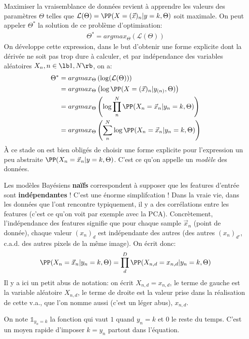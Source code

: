 \documentclass[french,twoside]{article}
\begin{document}
Maximiser la vraisemblance de données revient à apprendre les valeurs des paramètres $\Theta$ telles que $\mathcal{L}(\Theta) = \PP(X=(\vec{x})_n | y=k, \Theta)$ soit maximale. On peut appeler $\Theta^*$ la solution de ce problème d'optimisation:
\begin{align}
\Theta^* = argmax_\Theta (\mathcal{L}(\Theta) )
\end{align}
On développe cette expression, dans le but d'obtenir une forme explicite dont la dérivée ne soit pas trop dure à calculer, et par indépendance des variables aléatoires $X_n, n \in \lb 1, N \rb$, on a:
\begin{align}
\Theta^*
&= argmax_\Theta \left(\log(\mathcal{L}(\Theta) )   \right)
\\
&= argmax_\Theta \left( \log \PP(X=(\vec{x})_n | y_{(n)}, \Theta)        \right) \\
&= argmax_\Theta \left( \log \prod_n^N \PP(X_n=\vec{x}_n | y_n=k, \Theta)        \right) \\
&= argmax_\Theta \left(\sum_n^N \log \PP(X_n=\vec{x}_n | y_n=k, \Theta)        \right)
\end{align}
À ce stade on est bien obligés de choisir une forme explicite pour l'expression un peu abstraite $\PP(X_n=\vec{x}_n | y=k, \Theta)  $. C'est ce qu'on appelle un \textit{modèle} des données.

Les modèles Bayésiens \textbf{naïfs} correspondent à supposer que les features d'entrée sont \textbf{indépendantes} !
C'est une énorme simplifcation ! Dans la vraie vie, dans les données que l'ont rencontre typiquement, il y a des corrélations entre les features (c'est ce qu'on voit par exemple avec la PCA). Concrètement, l'indépendance des features signifie que pour chaque sample $\vec{x}_n$ (point de donnée), chaque valeur $(x_n)_d$ est indépendante des autres (des autres $(x_n)_{d'}$, c.a.d. des autres pixels de la même image). On écrit donc:
\begin{align}
\PP(X_n=\vec{x}_n | y_n=k, \Theta) = \prod_d^D \PP(X_{n,d}= x_{n,d} | y_n=k, \Theta)
\end{align}
Il y a ici un petit abus de notation: on écrit $X_{n,d}= x_{n,d} $, le terme de gauche est la variable aléatoire $X_{n,d}$, le terme de droite est la valeur prise dans la réalisation de cette v.a., que l'on nomme aussi (c'est un léger abus), $x_{n,d}$.

On note $\mathbb{1}_{y_n=k}$ la fonction qui vaut $1$ quand $y_n=k$ et $0$ le reste du temps.
C'est un moyen rapide d'imposer $k=y_n$ partout dans l'équation.
\end{document}
